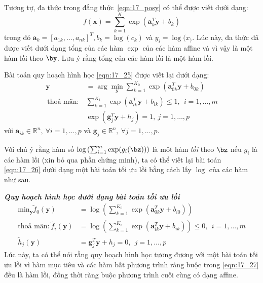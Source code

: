 Tương tự, đa thức trong đẳng thức~\eqref{eqn:17_posy} có thể
được viết dưới dạng:
\begin{equation*} 
f(\mathbf{x}) = \sum_{k = 1}^K \exp(\mathbf{a}_k^T\mathbf{y} + b_k) 
\end{equation*} 
trong đó $\mathbf{a}_k = [a_{1k}, \dots, a_{nk}]^T, b_k = \log(c_k)$ và $y_i =
\log(x_)$. Lúc này, đa thức đã được viết dưới dạng tổng của các hàm
$\exp$ của các hàm {affine} và vì vậy là một hàm lồi theo $\by$. Lưu ý rằng tổng của các hàm lồi là một hàm lồi.

Bài toán quy hoạch hình học \eqref{eqn:17_25} được viết lại dưới dạng:  
\begin{equation} 
\label{eqn:17_26}
\begin{aligned}
    \mathbf{y} &= \arg\min_{\mathbf{y}} \sum_{k=1}^{K_0}
    \exp(\mathbf{a}_{0k}^T\mathbf{y} + b_{0k})                      \\\ 
\text{thoả mãn:}~ & \sum_{k=1}^{K_i} \exp(\mathbf{a}_{ik}^T\mathbf{y} + b_{ik}) \leq 1, ~~i = 1, \dots, m\\\ 
& \exp(\mathbf{g}_j^T\mathbf{y} + h_j) = 1, ~ j= 1, \dots, p 
    \end{aligned}
\end{equation} 
với $\mathbf{a}_{ik} \in \mathbb{R}^n,~\forall i = 1, \dots, p$ và $\mathbf{g}_j
\in
\mathbb{R}^n,~\forall j = 1, \dots, p$. 
 
Với chú ý rằng hàm số $\log \left(\sum_{i=1}^m
\exp(g_i(\mathbf{\bz}))\right)$ là môt hàm \textit{lồi} theo $\bz$ nếu $g_i$ là
các hàm {lồi} (xin bỏ qua phần chứng minh), ta có thể viết lại bài
toán \eqref{eqn:17_26} dưới dạng một bài toán tối ưu lồi bằng cách lấy $\log$ của các hàm như sau.

\textbf{\textit{{Quy hoạch hình học dưới dạng bài toán tối ưu lồi}}}
\begin{equation} 
 \label{eqn:17_27}
 \begin{aligned}
    \text{min}_{\mathbf{y}} \tilde{f}_0(\mathbf{y}) &= \log\left(\sum_{k=1}^{K_0} \exp(\mathbf{a}_{0k}^T \mathbf{y} + b_{i0})\right) \\
\text{thoả mãn:}~ \tilde{f}_i(\mathbf{y}) &= \log \left(\sum_{k=1}^{K_i} \exp(\mathbf{a}_{ik}^T \mathbf{y} + b_{ik})\right) \leq 0, ~~ i = 1, \dots, m \\ 
\tilde{h}_j(\mathbf{y}) &= \mathbf{g}_j^T\mathbf{y} + h_j = 0,~~ j = 1, \dots, p
 \end{aligned}
\end{equation} 
Lúc này, ta có thể nói rằng quy hoạch hình học tương đương với một bài toán tối ưu lồi vì hàm
mục tiêu và các hàm bất phương trình ràng buộc trong \eqref{eqn:17_27} đều là hàm
lồi, đồng thời ràng buộc phương trình cuối cùng có dạng {affine}. 
 
